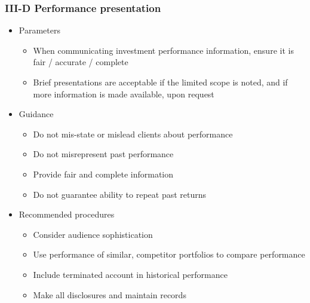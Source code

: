 \documentclass[../notes_compiled.tex]{subfiles}
\begin{document}
\subsubsection{III-D Performance presentation}
\begin{itemize}
\item Parameters
\begin{itemize}
\item When communicating investment performance information, ensure it is fair / accurate / complete
\item Brief presentations are acceptable if the limited scope is noted, and if more information is made available, upon request
\end{itemize}
\item Guidance
\begin{itemize}
\item Do not mis-state or mislead clients about performance
\item Do not misrepresent past performance
\item Provide fair and complete information
\item Do not guarantee ability to repeat past returns
\end{itemize}
\item Recommended procedures
\begin{itemize}
\item Consider audience sophistication
\item Use performance of similar, competitor portfolios to compare performance
\item Include terminated account in historical performance
\item Make all disclosures and maintain records
\end{itemize}
\end{itemize}
\end{document}
